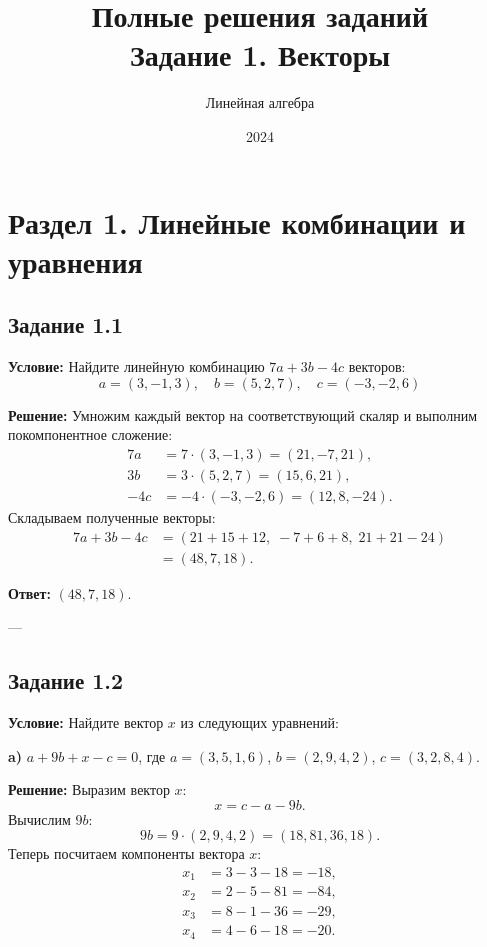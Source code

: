 \documentclass[11pt, a4paper]{article}
\title{\textbf{Полные решения заданий}\\ \large Задание 1. Векторы}
\author{Линейная алгебра}
\date{2024}
\begin{document}
\maketitle

\section{Раздел 1. Линейные комбинации и уравнения}

\subsection*{Задание 1.1}
\textbf{Условие:} Найдите линейную комбинацию $7a+3b-4c$ векторов:
$$ a = (3, -1, 3), \quad b = (5, 2, 7), \quad c = (-3, -2, 6) $$

\textbf{Решение:}
Умножим каждый вектор на соответствующий скаляр и выполним покомпонентное сложение:
\begin{align*}
7a &= 7 \cdot (3, -1, 3) = (21, -7, 21), \\
3b &= 3 \cdot (5, 2, 7) = (15, 6, 21), \\
-4c &= -4 \cdot (-3, -2, 6) = (12, 8, -24).
\end{align*}
Складываем полученные векторы:
\begin{align*}
7a + 3b - 4c &= (21 + 15 + 12, \; -7 + 6 + 8, \; 21 + 21 - 24) \\
&= (48, 7, 18).
\end{align*}

\textbf{Ответ:} $(48, 7, 18)$.

---

\subsection*{Задание 1.2}
\textbf{Условие:} Найдите вектор $x$ из следующих уравнений:

\medskip
\textbf{a)} $a + 9b + x - c = 0$, где $a = (3, 5, 1, 6)$, $b = (2, 9, 4, 2)$, $c = (3, 2, 8, 4)$.

\textbf{Решение:}
Выразим вектор $x$:
$$ x = c - a - 9b. $$
Вычислим $9b$:
$$ 9b = 9 \cdot (2, 9, 4, 2) = (18, 81, 36, 18). $$
Теперь посчитаем компоненты вектора $x$:
\begin{align*}
x_1 &= 3 - 3 - 18 = -18, \\
x_2 &= 2 - 5 - 81 = -84, \\
x_3 &= 8 - 1 - 36 = -29, \\
x_4 &= 4 - 6 - 18 = -20.
\end{align*}
\end{document}

